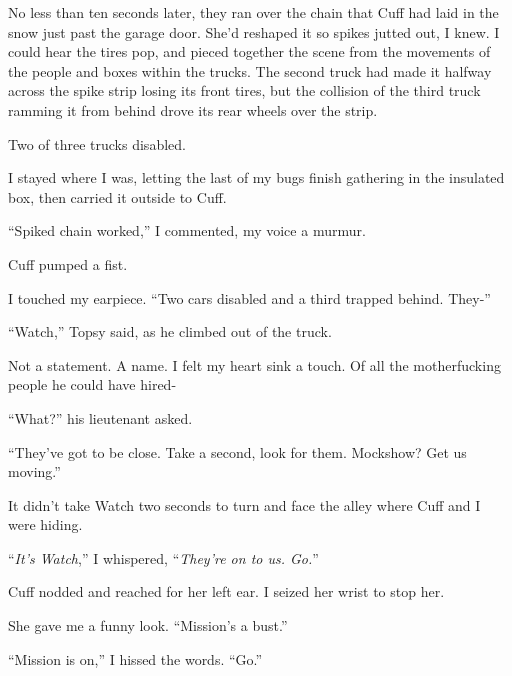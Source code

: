 No less than ten seconds later, they ran over the chain that Cuff had laid in the snow just past the garage door.  She'd reshaped it so spikes jutted out, I knew.  I could hear the tires pop, and pieced together the scene from the movements of the people and boxes within the trucks.  The second truck had made it halfway across the spike strip losing its front tires, but the collision of the third truck ramming it from behind drove its rear wheels over the strip.



Two of three trucks disabled.



I stayed where I was, letting the last of my bugs finish gathering in the insulated box, then carried it outside to Cuff.



``Spiked chain worked,'' I commented, my voice a murmur.



Cuff pumped a fist.



I touched my earpiece.  ``Two cars disabled and a third trapped behind.  They-''



``Watch,'' Topsy said, as he climbed out of the truck.



Not a statement.  A name.  I felt my heart sink a touch.  Of all the motherfucking people he could have hired-



``What?'' his lieutenant asked.



``They've got to be close.  Take a second, look for them.  Mockshow?  Get us moving.''



It didn't take Watch two seconds to turn and face the alley where Cuff and I were hiding.



``\emph{It's Watch},'' I whispered, ``\emph{They're on to us.  Go.}''



Cuff nodded and reached for her left ear.  I seized her wrist to stop her.



She gave me a funny look.  ``Mission's a bust.''



``Mission is on,'' I hissed the words.  ``Go.''



